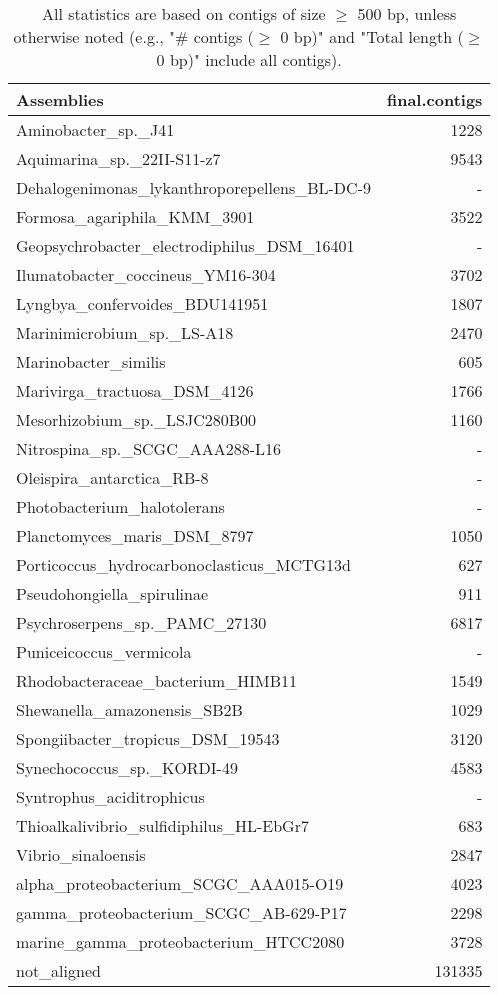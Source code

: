 \documentclass[12pt,a4paper]{article}
\begin{document}
\begin{table}[ht]
\begin{center}
\caption{All statistics are based on contigs of size $\geq$ 500 bp, unless otherwise noted (e.g., "\# contigs ($\geq$ 0 bp)" and "Total length ($\geq$ 0 bp)" include all contigs).}
\begin{tabular}{|l*{1}{|r}|}
\hline
Assemblies & final.contigs \\ \hline
Aminobacter\_sp.\_J41 & 1228 \\ \hline
Aquimarina\_sp.\_22II-S11-z7 & 9543 \\ \hline
Dehalogenimonas\_lykanthroporepellens\_BL-DC-9 & - \\ \hline
Formosa\_agariphila\_KMM\_3901 & 3522 \\ \hline
Geopsychrobacter\_electrodiphilus\_DSM\_16401 & - \\ \hline
Ilumatobacter\_coccineus\_YM16-304 & 3702 \\ \hline
Lyngbya\_confervoides\_BDU141951 & 1807 \\ \hline
Marinimicrobium\_sp.\_LS-A18 & 2470 \\ \hline
Marinobacter\_similis & 605 \\ \hline
Marivirga\_tractuosa\_DSM\_4126 & 1766 \\ \hline
Mesorhizobium\_sp.\_LSJC280B00 & 1160 \\ \hline
Nitrospina\_sp.\_SCGC\_AAA288-L16 & - \\ \hline
Oleispira\_antarctica\_RB-8 & - \\ \hline
Photobacterium\_halotolerans & - \\ \hline
Planctomyces\_maris\_DSM\_8797 & 1050 \\ \hline
Porticoccus\_hydrocarbonoclasticus\_MCTG13d & 627 \\ \hline
Pseudohongiella\_spirulinae & 911 \\ \hline
Psychroserpens\_sp.\_PAMC\_27130 & 6817 \\ \hline
Puniceicoccus\_vermicola & - \\ \hline
Rhodobacteraceae\_bacterium\_HIMB11 & 1549 \\ \hline
Shewanella\_amazonensis\_SB2B & 1029 \\ \hline
Spongiibacter\_tropicus\_DSM\_19543 & 3120 \\ \hline
Synechococcus\_sp.\_KORDI-49 & 4583 \\ \hline
Syntrophus\_aciditrophicus & - \\ \hline
Thioalkalivibrio\_sulfidiphilus\_HL-EbGr7 & 683 \\ \hline
Vibrio\_sinaloensis & 2847 \\ \hline
alpha\_proteobacterium\_SCGC\_AAA015-O19 & 4023 \\ \hline
gamma\_proteobacterium\_SCGC\_AB-629-P17 & 2298 \\ \hline
marine\_gamma\_proteobacterium\_HTCC2080 & 3728 \\ \hline
not\_aligned & 131335 \\ \hline
\end{tabular}
\end{center}
\end{table}
\end{document}
